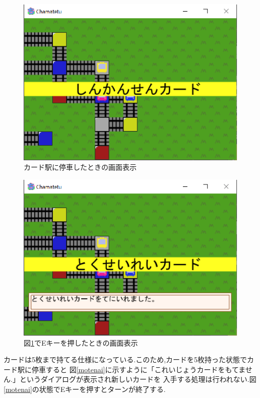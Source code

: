 \documentclass[a4j]{jarticle}
\begin{document}
    \begin{figure}[H]
        \centering
        \includegraphics[scale=1.3]{randcard.eps}
        \caption{カード駅に停車したときの画面表示}
         \label{randcard}
        \end{figure}

    \begin{figure}[H]
        \centering
        \includegraphics[scale=1.3]{randresult.eps}
        \caption{図\ref{randcard}でEキーを押したときの画面表示}
         \label{randresult}
        \end{figure}

    カードは5枚まで持てる仕様になっている.このため,カードを5枚持った状態でカード駅に停車すると
    図\ref{motenai}に示すように「これいじょうカードをもてません.」というダイアログが表示され新しいカードを
    入手する処理は行われない.図\ref{motenai}の状態でEキーを押すとターンが終了する.
\end{document}
